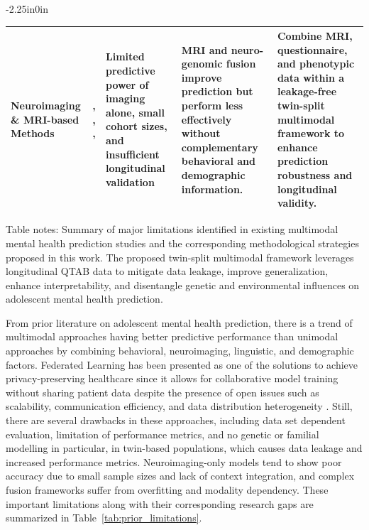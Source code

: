 \documentclass[10pt,letterpaper]{article}
\begin{document}
\begin{table}[!t]
\begin{adjustwidth}{-2.25in}{0in}
\begin{tabular}{|p{2.8cm}|p{2.0cm}|p{3.8cm}|p{4.5cm}|p{4.8cm}|}
Neuroimaging \& MRI-based Methods
& \cite{ref23}, \cite{ref24}, \cite{ref25}, \cite{ref27}
& Limited predictive power of imaging alone, small cohort sizes, and insufficient longitudinal validation
& MRI and neuro-genomic fusion improve prediction but perform less effectively without complementary behavioral and demographic information.
& Combine MRI, questionnaire, and phenotypic data within a leakage-free twin-split multimodal framework to enhance prediction robustness and longitudinal validity. \\
\hline

\end{tabular}

\begin{flushleft}
Table notes: Summary of major limitations identified in existing multimodal mental health prediction studies and the corresponding methodological strategies proposed in this work. The proposed twin-split multimodal framework leverages longitudinal QTAB data to mitigate data leakage, improve generalization, enhance interpretability, and disentangle genetic and environmental influences on adolescent mental health prediction.
\end{flushleft}

\end{adjustwidth}
\end{table}

From prior literature on adolescent mental health prediction, there is a trend of multimodal approaches having better predictive performance than unimodal approaches by combining behavioral, neuroimaging, linguistic, and demographic factors. Federated Learning has been presented as one of the solutions to achieve privacy-preserving healthcare since it allows for collaborative model training without sharing patient data despite the presence of open issues such as scalability, communication efficiency, and data distribution heterogeneity \cite{ref66}. Still, there are several drawbacks in these approaches, including data set dependent evaluation, limitation of performance metrics, and no genetic or familial modelling in particular, in twin-based populations, which causes data leakage and increased performance metrics. Neuroimaging-only models tend to show poor accuracy due to small sample sizes and lack of context integration, and complex fusion frameworks suffer from overfitting and modality dependency. These important limitations along with their corresponding research gaps are summarized in Table~\ref{tab:prior_limitations}.
\end{document}
